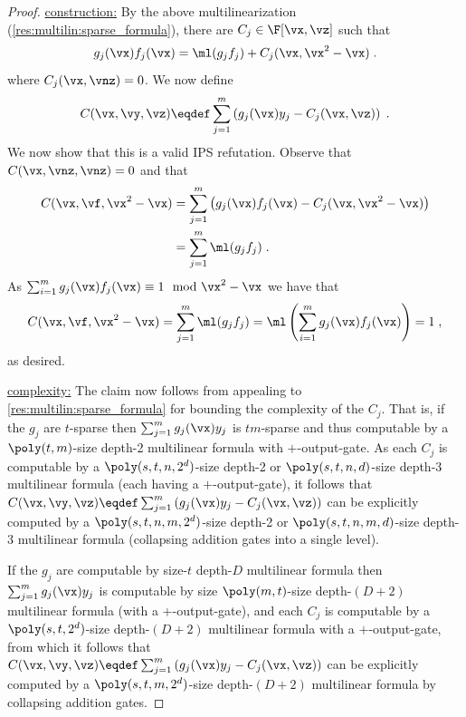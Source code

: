 \documentclass{toc}
\begin{document}
\begin{proof}
        \uline{construction:}
        By the above multilinearization (\autoref{res:multilin:sparse_formula}), there are $C_j\in\F[\vx,\vz]$ such that
        \[
                g_j(\vx)f_j(\vx)=\ml(g_jf_j)+C_j(\vx,\vx^2-\vx)
                \;.
        \]
        where $C_j(\vx,\vnz)=0$. We now define
        \[
                C(\vx,\vy,\vz)\eqdef \sum_{j=1}^m \left (g_j(\vx)y_j - C_j(\vx,\vz)\right)
                \;.
        \]
        We now show that this is a valid IPS refutation. Observe that $C(\vx,\vnz,\vnz)=0$ and that
        \begin{align*}
                C(\vx,\vf,\vx^2-\vx)
                &=\sum_{j=1}^m \left (g_j(\vx)f_j(\vx) - C_j(\vx,\vx^2-\vx)\right)\\\
                &=\sum_{j=1}^m \ml(g_jf_j)
                \;.
        \end{align*}
        As $\sum_{i=1}^m g_j(\vx)f_j(\vx)\equiv 1\mod \vx^2-\vx$ we have that
        \[
                C(\vx,\vf,\vx^2-\vx)
                =\sum_{j=1}^m \ml(g_jf_j)
                =\ml\left(\sum_{i=1}^m g_j(\vx)f_j(\vx)\right)
                =1
                \;,
        \]
        as desired.

%


        \uline{complexity:}
        The claim now follows from appealing to \autoref{res:multilin:sparse_formula} for bounding the complexity of the $C_j$.  That is, if the $g_j$ are $t$-sparse then $\sum_{j=1}^m g_j(\vx)y_j$ is $tm$-sparse and thus computable by a $\poly(t,m)$-size depth-2 multilinear formula with $+$-output-gate. As each $C_j$ is computable by a $\poly(s,t,n,2^d)$-size depth-2 or $\poly(s,t,n,d)$-size depth-3 multilinear formula (each having a $+$-output-gate), it follows that $C(\vx,\vy,\vz)\eqdef \sum_{j=1}^m \left (g_j(\vx)y_j - C_j(\vx,\vz)\right)$ can be explicitly computed by a $\poly(s,t,n,m,2^d)$-size depth-2 or $\poly(s,t,n,m,d)$-size depth-3 multilinear formula (collapsing addition gates into a single level).

        If the $g_j$ are computable by size-$t$ depth-$D$ multilinear formula then $\sum_{j=1}^m g_j(\vx)y_j$ is computable by size $\poly(m,t)$-size depth-$(D+2)$ multilinear formula (with a $+$-output-gate), and each $C_j$ is computable by a $\poly(s,t,2^d)$-size depth-$(D+2)$ multilinear formula with a $+$-output-gate, from which it follows that $C(\vx,\vy,\vz)\eqdef \sum_{j=1}^m \left (g_j(\vx)y_j - C_j(\vx,\vz)\right)$ can be explicitly computed by a $\poly(s,t,m,2^d)$-size depth-$(D+2)$ multilinear formula by collapsing addition gates.
\end{proof}
\end{document}
